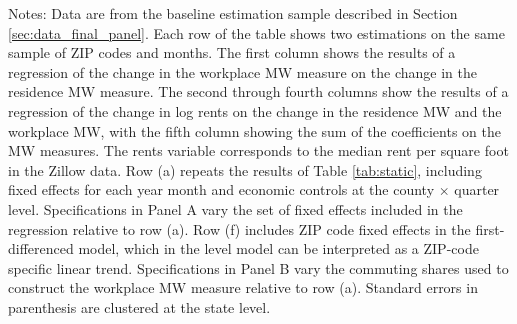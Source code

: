 \begin{landscape}
\begin{table}[ht!]
    \begin{minipage}{.95\linewidth} \footnotesize
        \vspace{2mm}
        Notes: 
        Data are from the baseline estimation sample described in Section 
        \ref{sec:data_final_panel}.
        Each row of the table shows two estimations on the same sample of ZIP 
        codes and months.
        The first column shows the results of a regression of the change in the 
        workplace MW measure on the change in the residence MW measure.
        The second through fourth columns show the results of a regression of 
        the change in log rents on the change in the residence MW and the 
        workplace MW, with the fifth column showing the sum of the coefficients 
        on the MW measures.
        The rents variable corresponds to the median rent per square foot in
        the Zillow data.
        Row (a) repeats the results of Table \ref{tab:static}, including fixed
        effects for each year month and economic controls at the 
        county $\times$ quarter level.
        Specifications in Panel A vary the set of fixed effects included in the 
        regression relative to row (a).
        Row (f) includes ZIP code fixed effects in the first-differenced model,
        which in the level model can be interpreted as a ZIP-code specific 
        linear trend.
        Specifications in Panel B vary the commuting shares used to construct 
        the workplace MW measure relative to row (a).
        Standard errors in parenthesis are clustered at the state level.
    \end{minipage}
\end{table}
\end{landscape}
